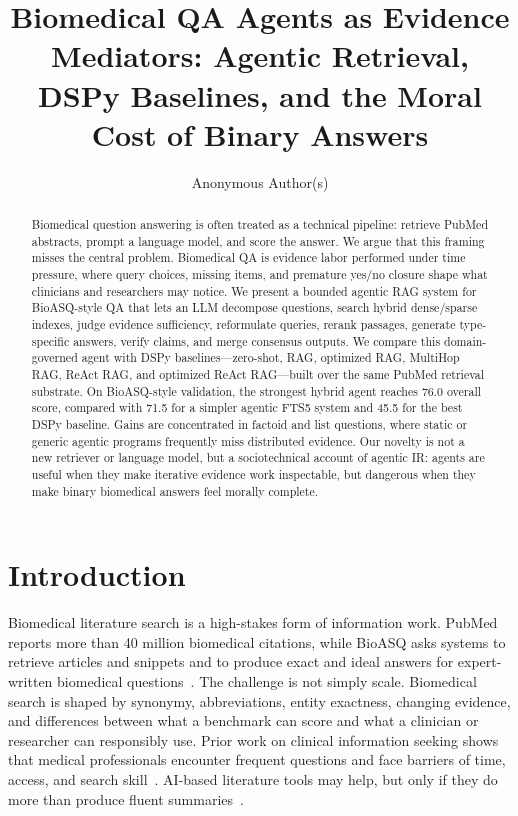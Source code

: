 \documentclass[sigconf,nonacm]{acmart}
\begin{document}
\title{Biomedical QA Agents as Evidence Mediators: Agentic Retrieval, DSPy Baselines, and the Moral Cost of Binary Answers}

\author{Anonymous Author(s)}
\affiliation{}

\begin{abstract}
Biomedical question answering is often treated as a technical pipeline: retrieve PubMed abstracts, prompt a language model, and score the answer. We argue that this framing misses the central problem. Biomedical QA is evidence labor performed under time pressure, where query choices, missing items, and premature yes/no closure shape what clinicians and researchers may notice. We present a bounded agentic RAG system for BioASQ-style QA that lets an LLM decompose questions, search hybrid dense/sparse indexes, judge evidence sufficiency, reformulate queries, rerank passages, generate type-specific answers, verify claims, and merge consensus outputs. We compare this domain-governed agent with DSPy baselines---zero-shot, RAG, optimized RAG, MultiHop RAG, ReAct RAG, and optimized ReAct RAG---built over the same PubMed retrieval substrate. On BioASQ-style validation, the strongest hybrid agent reaches 76.0 overall score, compared with 71.5 for a simpler agentic FTS5 system and 45.5 for the best DSPy baseline. Gains are concentrated in factoid and list questions, where static or generic agentic programs frequently miss distributed evidence. Our novelty is not a new retriever or language model, but a sociotechnical account of agentic IR: agents are useful when they make iterative evidence work inspectable, but dangerous when they make binary biomedical answers feel morally complete.
\end{abstract}

\maketitle

\section{Introduction}

Biomedical literature search is a high-stakes form of information work. PubMed reports more than 40 million biomedical citations, while BioASQ asks systems to retrieve articles and snippets and to produce exact and ideal answers for expert-written biomedical questions~\cite{bioasq_task14b, bioasq_challenge}. The challenge is not simply scale. Biomedical search is shaped by synonymy, abbreviations, entity exactness, changing evidence, and differences between what a benchmark can score and what a clinician or researcher can responsibly use. Prior work on clinical information seeking shows that medical professionals encounter frequent questions and face barriers of time, access, and search skill~\cite{bastregari2020}. AI-based literature tools may help, but only if they do more than produce fluent summaries~\cite{pubmed_beyond}.
\end{document}
